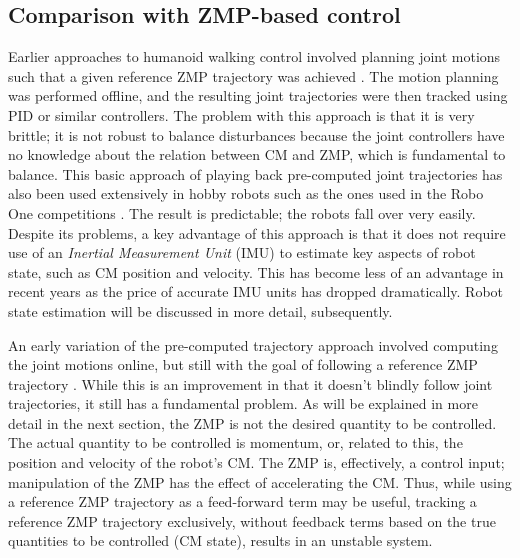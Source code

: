 \documentclass{llncs}
\begin{document}
\subsection{Comparison with ZMP-based control}

Earlier approaches to humanoid walking control involved planning joint motions such that a 
given reference ZMP trajectory was achieved \cite{nishiwaki2001online}.
The motion planning was performed offline, and the resulting joint trajectories were then tracked 
using PID or similar controllers.
The problem with this approach is that it is very brittle;  it is not robust to balance disturbances
because the joint controllers have no knowledge about the relation between CM and ZMP, which is 
fundamental to balance.
This basic approach of playing back pre-computed joint trajectories has also been used extensively
in hobby robots such as the ones used in the Robo One competitions \cite{roboone}.  
The result is predictable;  the robots fall over very easily.
Despite its problems, a key advantage of this approach is that it does not require use of an
\textit{Inertial Measurement Unit} (IMU) to estimate key aspects of robot state, such as CM position
and velocity.  
This has become less of an advantage in recent years as the price of accurate 
IMU units has dropped dramatically.
Robot state estimation will be discussed in more detail, subsequently.

An early variation of the pre-computed trajectory approach involved computing the joint motions 
online, but still with the goal of following a reference ZMP trajectory \cite{nishiwaki2002online, 
kagami2002fast, sugihar2002real}.  
While this is an improvement in that it doesn't blindly follow
joint trajectories, it still has a fundamental problem.
As will be explained in more detail in the next section, the ZMP is not the desired quantity to be
controlled. 
The actual quantity to be controlled is momentum, or, related to this, the position and velocity of the 
robot's CM.
The ZMP is, effectively, a control input;  manipulation of the ZMP has the effect of accelerating the CM.
Thus, while using a reference ZMP trajectory as a feed-forward term may be useful,
tracking a reference ZMP trajectory exclusively, without feedback terms based on the true
quantities to be controlled (CM state), results in an unstable system.
\end{document}
